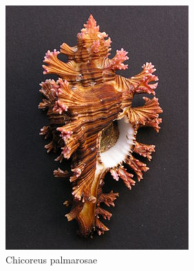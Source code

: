 \documentclass[a4paper]{article}
\begin{document}
\begin{figure}[h]
	\centering\includegraphics[scale=0.7]{./img/chicoreus_palmarosae.jpg}
	\caption{Chicoreus palmarosae \cite{wikipedia-chicoreus}}
	\label{fig:chicoreus_palmarosae} %
\end{figure}



\end{document}
